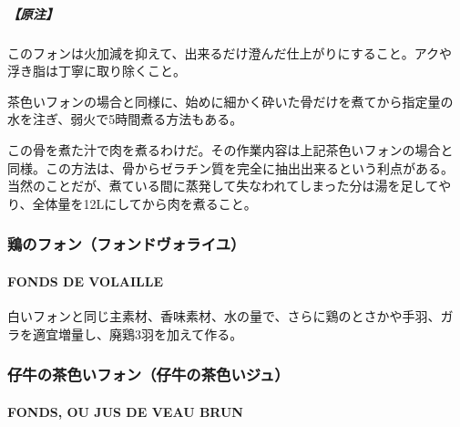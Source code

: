 \begin{recette}
\hypertarget{ux539fux6ce8-1}{%
\subparagraph{【原注】}\label{ux539fux6ce8-1}}

このフォンは火加減を抑えて、出来るだけ澄んだ仕上がりにすること。アクや
浮き脂は丁寧に取り除くこと。

茶色いフォンの場合と同様に、始めに細かく砕いた骨だけを煮てから指定量の
水を注ぎ、弱火で5時間煮る方法もある。

この骨を煮た汁で肉を煮るわけだ。その作業内容は上記茶色いフォンの場合と
同様。この方法は、骨からゼラチン質を完全に抽出出来るという利点がある。
当然のことだが、煮ている間に蒸発して失なわれてしまった分は湯を足してや
り、全体量を12Lにしてから肉を煮ること。

\maeaki

\hypertarget{ux9d8fux306eux30d5ux30a9ux30f3ux30d5ux30a9ux30f3ux30c9ux30f4ux30a9ux30e9ux30a4ux30e6}{%
\subsubsection{鶏のフォン（フォンドヴォライユ）}\label{ux9d8fux306eux30d5ux30a9ux30f3ux30d5ux30a9ux30f3ux30c9ux30f4ux30a9ux30e9ux30a4ux30e6}}

\hypertarget{fonds-de-volaille}{%
\paragraph{FONDS DE VOLAILLE}\label{fonds-de-volaille}}


白いフォンと同じ主素材、香味素材、水の量で、さらに鶏のとさかや手羽、ガ
ラを適宜増量し、廃鶏3羽を加えて作る。

\maeaki

\hypertarget{ux4ed4ux725bux306eux8336ux8272ux3044ux30d5ux30a9ux30f3ux4ed4ux725bux306eux8336ux8272ux3044ux30b8ux30e5}{%
\subsubsection{仔牛の茶色いフォン（仔牛の茶色いジュ）}\label{ux4ed4ux725bux306eux8336ux8272ux3044ux30d5ux30a9ux30f3ux4ed4ux725bux306eux8336ux8272ux3044ux30b8ux30e5}}

\hypertarget{fonds-de-veau-brun}{%
\paragraph{FONDS, OU JUS DE VEAU BRUN}\label{fonds-de-veau-brun}}


\end{recette}
